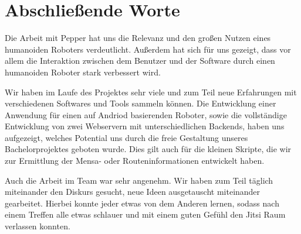 \chapter{Abschließende Worte}
\label{sec:zusammenfassung}

Die Arbeit mit Pepper hat uns die Relevanz und den großen Nutzen eines humanoiden Roboters verdeutlicht. Außerdem hat sich für uns gezeigt, dass vor allem die Interaktion zwischen dem Benutzer und der Software durch einen humanoiden Roboter stark verbessert wird.

Wir haben im Laufe des Projektes sehr viele und zum Teil neue Erfahrungen mit verschiedenen Softwares und Tools sammeln können. Die Entwicklung einer Anwendung für einen auf Andriod basierenden Roboter, sowie die vollständige Entwicklung von zwei Webservern mit unterschiedlichen Backends, haben uns aufgezeigt, welches Potential uns durch die freie Gestaltung unseres Bachelorprojektes geboten wurde. Dies gilt auch für die kleinen Skripte, die wir zur Ermittlung der Mensa- oder Routeninformationen entwickelt haben.

Auch die Arbeit im Team war sehr angenehm. Wir haben zum Teil täglich miteinander den Diskurs gesucht, neue Ideen ausgetauscht miteinander gearbeitet. Hierbei konnte jeder etwas von dem Anderen lernen, sodass nach einem Treffen alle etwas schlauer und mit einem guten Gefühl den Jitsi Raum verlassen konnten.
